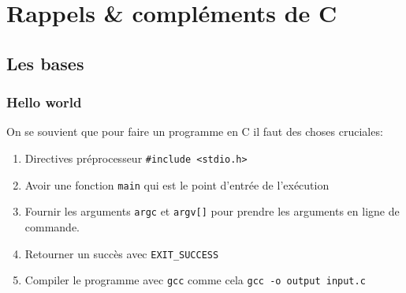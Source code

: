 \section{Rappels \& compléments de C}\label{rappels-compluxe9ments-de-c}

\subsection{Les bases}\label{les-bases}

\subsubsection{Hello world}\label{hello-world}

On se souvient que pour faire un programme en C il faut des choses
cruciales:

\begin{enumerate}
\def\labelenumi{\arabic{enumi}.}
\tightlist
\item
  Directives préprocesseur
  \texttt{\#include\ \textless{}stdio.h\textgreater{}}
\item
  Avoir une fonction \texttt{main} qui est le point d'entrée de
  l'exécution
\item
  Fournir les arguments \texttt{argc} et \texttt{argv{[}{]}} pour
  prendre les arguments en ligne de commande.
\item
  Retourner un succès avec \texttt{EXIT\_SUCCESS}
\item
  Compiler le programme avec \texttt{gcc} comme cela
  \texttt{gcc\ -o\ output\ input.c}
\end{enumerate}

\begin{Shaded}
\begin{Highlighting}[]

\OperatorTok{(}\OperatorTok{,} \OperatorTok{*}\OperatorTok{[])\{}
\OperatorTok{(}\OperatorTok{);}

    \OperatorTok{;}
\OperatorTok{\}}
\end{Highlighting}
\end{Shaded}

